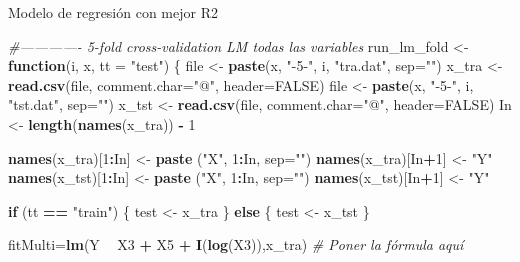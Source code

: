 \documentclass[
]{article}
\newenvironment{Shaded}{\begin{snugshade}}{\end{snugshade}}
\newcommand{\CommentTok}[1]{\textcolor[rgb]{0.56,0.35,0.01}{\textit{#1}}}
\newcommand{\ControlFlowTok}[1]{\textcolor[rgb]{0.13,0.29,0.53}{\textbf{#1}}}
\newcommand{\DataTypeTok}[1]{\textcolor[rgb]{0.13,0.29,0.53}{#1}}
\newcommand{\DecValTok}[1]{\textcolor[rgb]{0.00,0.00,0.81}{#1}}
\newcommand{\KeywordTok}[1]{\textcolor[rgb]{0.13,0.29,0.53}{\textbf{#1}}}
\newcommand{\NormalTok}[1]{#1}
\newcommand{\OperatorTok}[1]{\textcolor[rgb]{0.81,0.36,0.00}{\textbf{#1}}}
\newcommand{\OtherTok}[1]{\textcolor[rgb]{0.56,0.35,0.01}{#1}}
\newcommand{\StringTok}[1]{\textcolor[rgb]{0.31,0.60,0.02}{#1}}
\begin{document}
Modelo de regresión con mejor R2

\begin{Shaded}
\begin{Highlighting}[]
\CommentTok{#------------- 5-fold cross-validation LM todas las variables}
\NormalTok{run_lm_fold <-}\StringTok{ }\ControlFlowTok{function}\NormalTok{(i, x, }\DataTypeTok{tt =} \StringTok{"test"}\NormalTok{) \{}
\NormalTok{    file <-}\StringTok{ }\KeywordTok{paste}\NormalTok{(x, }\StringTok{"-5-"}\NormalTok{, i, }\StringTok{"tra.dat"}\NormalTok{, }\DataTypeTok{sep=}\StringTok{""}\NormalTok{)}
\NormalTok{    x_tra <-}\StringTok{ }\KeywordTok{read.csv}\NormalTok{(file, }\DataTypeTok{comment.char=}\StringTok{"@"}\NormalTok{, }\DataTypeTok{header=}\OtherTok{FALSE}\NormalTok{)}
\NormalTok{    file <-}\StringTok{ }\KeywordTok{paste}\NormalTok{(x, }\StringTok{"-5-"}\NormalTok{, i, }\StringTok{"tst.dat"}\NormalTok{, }\DataTypeTok{sep=}\StringTok{""}\NormalTok{)}
\NormalTok{    x_tst <-}\StringTok{ }\KeywordTok{read.csv}\NormalTok{(file, }\DataTypeTok{comment.char=}\StringTok{"@"}\NormalTok{, }\DataTypeTok{header=}\OtherTok{FALSE}\NormalTok{)}
\NormalTok{    In <-}\StringTok{ }\KeywordTok{length}\NormalTok{(}\KeywordTok{names}\NormalTok{(x_tra)) }\OperatorTok{-}\StringTok{ }\DecValTok{1}
    
    \KeywordTok{names}\NormalTok{(x_tra)[}\DecValTok{1}\OperatorTok{:}\NormalTok{In] <-}\StringTok{ }\KeywordTok{paste}\NormalTok{ (}\StringTok{"X"}\NormalTok{, }\DecValTok{1}\OperatorTok{:}\NormalTok{In, }\DataTypeTok{sep=}\StringTok{""}\NormalTok{)}
    \KeywordTok{names}\NormalTok{(x_tra)[In}\OperatorTok{+}\DecValTok{1}\NormalTok{] <-}\StringTok{ "Y"}
    \KeywordTok{names}\NormalTok{(x_tst)[}\DecValTok{1}\OperatorTok{:}\NormalTok{In] <-}\StringTok{ }\KeywordTok{paste}\NormalTok{ (}\StringTok{"X"}\NormalTok{, }\DecValTok{1}\OperatorTok{:}\NormalTok{In, }\DataTypeTok{sep=}\StringTok{""}\NormalTok{)}
    \KeywordTok{names}\NormalTok{(x_tst)[In}\OperatorTok{+}\DecValTok{1}\NormalTok{] <-}\StringTok{ "Y"}
    
    \ControlFlowTok{if}\NormalTok{ (tt }\OperatorTok{==}\StringTok{ "train"}\NormalTok{) \{}
\NormalTok{        test <-}\StringTok{ }\NormalTok{x_tra}
\NormalTok{    \}}
    \ControlFlowTok{else}\NormalTok{ \{}
\NormalTok{        test <-}\StringTok{ }\NormalTok{x_tst}
\NormalTok{    \}}
    
\NormalTok{    fitMulti=}\KeywordTok{lm}\NormalTok{(Y }\OperatorTok{~}\StringTok{ }\NormalTok{X3 }\OperatorTok{+}\StringTok{ }\NormalTok{X5 }\OperatorTok{+}\StringTok{ }\KeywordTok{I}\NormalTok{(}\KeywordTok{log}\NormalTok{(X3)),x_tra)  }\CommentTok{# Poner la fórmula aquí}
    

\end{Highlighting}
\end{Shaded}
\end{document}
